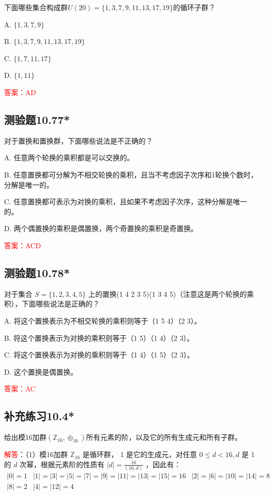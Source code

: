 \documentclass[UTF8, heading=true]{ctexart}
\begin{document}
下面哪些集合构成群$U(20)=\{1,3,7,9,11,13,17,19\}$的循环子群？

A. $\{1,3,7,9\}$

B. $\{1,3,7,9,11,13,17,19\}$

C. $\{1,7,11,17\}$

D. $\{1,11\}$

\textcolor{red}{答案：AD}

\subsection{测验题10.77*}

对于置换和置换群，下面哪些说法是不正确的？

A. 任意两个轮换的乘积都是可以交换的。

B. 任意置换都可分解为不相交轮换的乘积，且当不考虑因子次序和1轮换个数时，分解是唯一的。

C. 任意置换都可表示为对换的乘积，且如果不考虑因子次序，这种分解是唯一的。

D. 两个偶置换的乘积是偶置换，两个奇置换的乘积是奇置换。

\textcolor{red}{答案：ACD}

\subsection{测验题10.78*}

对于集合 $S=\{1,2,3,4,5\}$ 上的置换(1 4 2 3 5)(1 3 4 5)（注意这是两个轮换的乘积），下面哪些说法是正确的？

A. 将这个置换表示为不相交轮换的乘积则等于（1 5 4）（2 3）。

B. 将这个置换表示为对换的乘积则等于（1 5）（1 4）（2 3）。

C. 将这个置换表示为对换的乘积则等于（1 4）（1 5）（2 3）。

D. 这个置换是偶置换。

\textcolor{red}{答案：AC}

\subsection{补充练习10.4*}

给出模16加群$(\mathbb{Z}_{16},\oplus_{16})$所有元素的阶，以及它的所有生成元和所有子群。

\textcolor{red}{解答}：（1）模16加群 $\mathbb{Z}_{16}$ 是循环群， 1 是它的生成元，对任意 $0 \leq d<16, d$ 是 1 的 $d$ 次幂，根据元素阶的性质有 $|d|=\frac{16}{(16, d)}$ ，因此有：
$$
\begin{array}{lll}
|0|=1 & |1|=|3|=|5|=|7|=|9|=|11|=|13|=|15|=16 & |2|=|6|=|10|=|14|=8 \\
|8|=2 & |4|=|12|=4 &
\end{array}
$$
\end{document}
